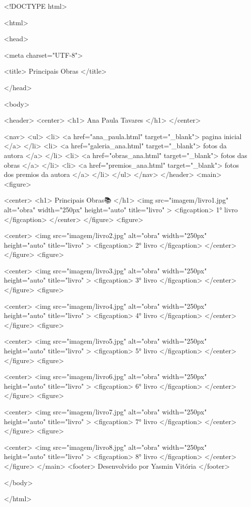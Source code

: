 <!DOCTYPE html>

<html>
       
 <head>
           
    <meta charset="UTF-8">
        
       <title> Principais Obras </title>
    
    </head>
     
   <body>
   
<header>
      <center>
      <h1>
       Ana Paula Tavares
       </h1>
      </center>
      
    <nav>
   <ul> 
    <li> <a href="ana_paula.html" target="_blank"> pagina inicial </a> </li>
    <li> <a href="galeria_ana.html" target="_blank"> fotos da autora </a> </li>
    <li> <a href="obras_ana.html" target="_blank"> fotos das obras </a> </li>
    <li> <a href="premios_ana.html" target="_blank"> fotos dos premios da autora </a> </li>
</ul> 
</nav>
</header>
<main>
   <figure>

    <center>  
   <h1> Principais Obras📚 </h1>
  <img src="imagem/livro1.jpg" alt="obra" width="250px" height="auto" title="livro" >
      <figcaption> 1° livro   </figcaption>
</center>
</figure>
    <figure>
	
<center>  
 <img src="imagem/livro2.jpg" alt="obra" width="250px" height="auto" title="livro" >
 <figcaption> 2° livro  </figcaption>
</center>
</figure>
    <figure>
	
<center>
  <img src="imagem/livro3.jpg" alt="obra" width="250px" height="auto" title="livro" >
 <figcaption> 3° livro   </figcaption>
</center>
</figure>
    <figure>
	
<center>
 <img src="imagem/livro4.jpg" alt="obra" width="250px" height="auto" title="livro" >
 <figcaption> 4° livro   </figcaption>
</center>
</figure>
    <figure>

<center>
  <img src="imagem/livro5.jpg" alt="obra" width="250px" height="auto" title="livro" >
 <figcaption> 5° livro   </figcaption>
</center>
</figure>
    <figure>
	
<center>
  <img src="imagem/livro6.jpg" alt="obra" width="250px" height="auto" title="livro" >
  <figcaption> 6° livro   </figcaption>
</center>
</figure>
    <figure>
  
 <center>
  <img src="imagem/livro7.jpg" alt="obra" width="250px" height="auto" title="livro" >
  <figcaption> 7° livro   </figcaption>
</center>
</figure>
    <figure>
	
<center>
  <img src="imagem/livro8.jpg" alt="obra" width="250px" height="auto" title="livro" >
 <figcaption>  8° livro  </figcaption>
</center>
</figure>
</main>
   <footer> Desenvolvido por Yasmin Vitória </footer> 
	 
	 
 </body>
	 
 </html>
